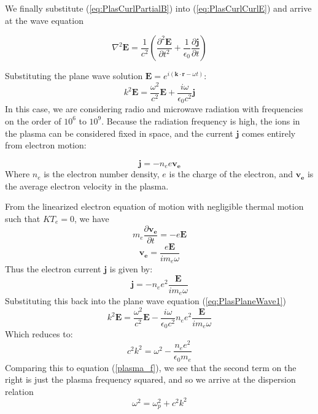 \documentclass[twocolumn]{article}
\begin{document}
We finally substitute (\ref{eq:PlasCurlPartialB}) into (\ref{eq:PlasCurlCurlE}) and arrive at the wave equation

\begin{equation}
	\nabla^2 \mathbf{E} = \frac{1}{c^2}(\frac{\partial^2 \mathbf{E}}{\partial t^2} + \frac{1}{\epsilon_0} \frac{\partial \mathbf{j}}{\partial t})
\end{equation}

Substituting the plane wave solution $\mathbf{E} = e^{i(\mathbf{k} \cdot \mathbf{r} - \omega t)}$:
\begin{equation}
	\label{eq:PlasPlaneWave1}
	k^2\mathbf{E} = \frac{\omega^2}{c^2}\mathbf{E} + \frac{i\omega}{\epsilon_0 c^2}\mathbf{j}
\end{equation}
In this case, we are considering radio and microwave radiation with frequencies on the order of $10^6$ to $10^9$.
Because the radiation frequency is high, the ions in the plasma can be considered fixed in space, and the current $\mathbf{j}$ comes entirely from electron motion:
 
\begin{equation}
	\mathbf{j} = -n_ee\mathbf{v_e}
\end{equation}
Where $n_e$ is the electron number density, $e$ is the charge of the electron, and $\mathbf{v_e}$ is the average electron velocity in the plasma.

From the linearized electron equation of motion with negligible thermal motion such that $KT_e = 0$, we have
\begin{equation}
	m_e\frac{\partial \mathbf{v_e}}{\partial t} = -e\mathbf{E}
\end{equation}
\begin{equation}
	\mathbf{v_e} = \frac{e\mathbf{E}}{im_e\omega}
\end{equation}
Thus the electron current $\mathbf{j}$ is given by:
\begin{equation}
	\mathbf{j} = -n_ee^2\frac{\mathbf{E}}{im_e\omega}
\end{equation}
Substituting this back into the plane wave equation (\ref{eq:PlasPlaneWave1})
\begin{equation}
	k^2\mathbf{E} = \frac{\omega^2}{c^2}\mathbf{E} - \frac{i\omega}{\epsilon_0 c^2}n_ee^2\frac{\mathbf{E}}{im_e\omega}
\end{equation}
Which reduces to:
\begin{equation*}
	c^2k^2 = \omega^2 - \frac{n_ee^2}{\epsilon_0m_e}
\end{equation*}
Comparing this to equation (\ref{plasma_f}), we see that the second term on the right is just the plasma frequency squared, and so we arrive at the dispersion relation
\begin{equation}
	\omega^2 = \omega^2_p + c^2k^2
\end{equation}
\end{document}
